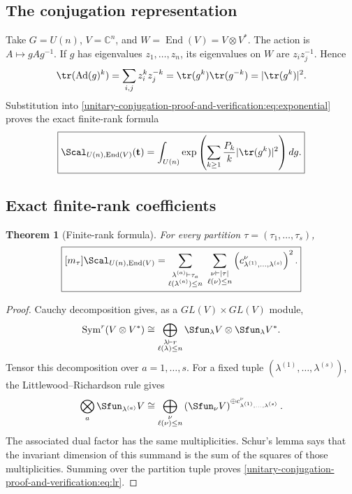 \documentclass[10pt]{article}
\newcommand{\Sym}{\operatorname{Sym}}
\newcommand{\C}{\mathbb C}
\newcommand{\End}{\operatorname{End}}
\newcommand{\Ad}{\operatorname{Ad}}
\newtheorem{theorem}{Theorem}
\begin{document}
\subsection{The conjugation representation}

Take $G=U(n)$, $V=\C^n$, and $W=\End(V)=V\otimes V^*$.  The action is
$A\mapsto gAg^{-1}$.  If $g$ has eigenvalues $z_1,\ldots,z_n$, its
eigenvalues on $W$ are $z_i z_j^{-1}$.  Hence
\begin{equation}\label{unitary-conjugation-proof-and-verification:eq:trace}
  \tr(\Ad(g)^k)
  =\sum_{i,j}z_i^kz_j^{-k}
  =\tr(g^k)\tr(g^{-k})
  =|\tr(g^k)|^2.
\end{equation}
Substitution into \eqref{unitary-conjugation-proof-and-verification:eq:exponential} proves the exact finite-rank formula
\begin{equation}\label{unitary-conjugation-proof-and-verification:eq:finite-integral}
  \boxed{
  \Scal_{U(n),\End(V)}(\mathbf t)
  =\int_{U(n)}\exp\left(
    \sum_{k\geq1}\frac{P_k}{k}|\tr(g^k)|^2
  \right)dg.}
\end{equation}

\subsection{Exact finite-rank coefficients}

\begin{theorem}[Finite-rank formula]\label{unitary-conjugation-proof-and-verification:thm:finite}
For every partition $\tau=(\tau_1,\ldots,\tau_s)$,
\begin{equation}\label{unitary-conjugation-proof-and-verification:eq:lr}
  \boxed{
  [m_\tau]\Scal_{U(n),\End(V)}
  =\sum_{\substack{
      \lambda^{(a)}\vdash\tau_a\\
      \ell(\lambda^{(a)})\leq n}}
    \ \sum_{\substack{\nu\vdash |\tau|\\\ell(\nu)\leq n}}
    \left(c_{\lambda^{(1)},\ldots,\lambda^{(s)}}^\nu\right)^2.}
\end{equation}
\end{theorem}

\begin{proof}
Cauchy decomposition gives, as a $GL(V)\times GL(V)$ module,
\[
  \Sym^r(V\otimes V^*)
  \cong\bigoplus_{\substack{\lambda\vdash r\\\ell(\lambda)\leq n}}
  \Sfun_\lambda V\otimes\Sfun_\lambda V^*.
\]
Tensor this decomposition over $a=1,\ldots,s$.  For a fixed tuple
$(\lambda^{(1)},\ldots,\lambda^{(s)})$, the Littlewood--Richardson rule gives
\[
  \bigotimes_a\Sfun_{\lambda^{(a)}}V
  \cong\bigoplus_{\substack{\nu\\\ell(\nu)\leq n}}
  \left(\Sfun_\nu V\right)^{\oplus
  c_{\lambda^{(1)},\ldots,\lambda^{(s)}}^\nu}.
\]
The associated dual factor has the same multiplicities.  Schur's lemma says
that the invariant dimension of this summand is the sum of the squares of
those multiplicities.  Summing over the partition tuple proves
\eqref{unitary-conjugation-proof-and-verification:eq:lr}.
\end{proof}
\end{document}
